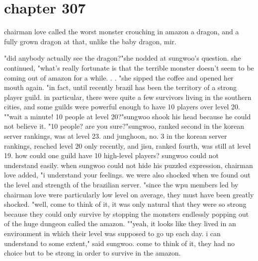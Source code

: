 \section{chapter 307}

chairman love called the worst monster crouching in amazon a dragon, and a fully grown dragon at that, unlike the baby dragon, mir.





"did anybody actually see the dragon?"she nodded at sungwoo's question.
she continued, "what's really fortunate is that the terrible monster doesn't seem to be coming out of amazon for a while.
.
.
"she sipped the coffee and opened her mouth again.
"in fact, until recently brazil has been the territory of a strong player guild.
 in particular, there were quite a few survivors living in the southern cities, and some guilds were powerful enough to have 10 players over level 20.
""wait a minute! 10 people at level 20?"sungwoo shook his head because he could not believe it.
"10 people? are you sure?"sungwoo, ranked second in the korean server rankings, was at level 23.
 and junghoon, no.
 3 in the korean server rankings, reached level 20 only recently, and jisu, ranked fourth, was still at level 19.
 how could one guild have 10 high-level players? sungwoo could not understand easily.
 when sungwoo could not hide his puzzled expression, chairman love added, "i understand your feelings.
 we were also shocked when we found out the level and strength of the brazilian server.
"since the wpu members led by chairman love were particularly low level on average, they must have been greatly shocked.
 "well, come to think of it, it was only natural that they were so strong because they could only survive by stopping the monsters endlessly popping out of the huge dungeon called the amazon.
""yeah, it looks like they lived in an environment in which their level was supposed to go up each day.
 i can understand to some extent," said sungwoo.
come to think of it, they had no choice but to be strong in order to survive in the amazon.
 
